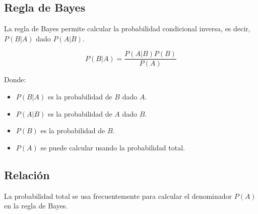 \documentclass[letterpaper, 12pt]{article}
\begin{document}
	\subsection{Regla de Bayes}
	
	La regla de Bayes permite calcular la probabilidad condicional inversa, es decir, $P(B | A)$ dado $P(A | B)$.
	
	\begin{equation*}
		P(B | A) = \frac{P(A | B) P(B)}{P(A)}
	\end{equation*}
	
	Donde:
	\begin{itemize}
		\item $P(B | A)$ es la probabilidad de $B$ dado $A$.
		\item $P(A | B)$ es la probabilidad de $A$ dado $B$.
		\item $P(B)$ es la probabilidad de $B$.
		\item $P(A)$ se puede calcular usando la probabilidad total.
	\end{itemize}
	
	\subsection{Relación}
	
	La probabilidad total se usa frecuentemente para calcular el denominador $P(A)$ en la regla de Bayes.
	
	\newpage
\end{document}
